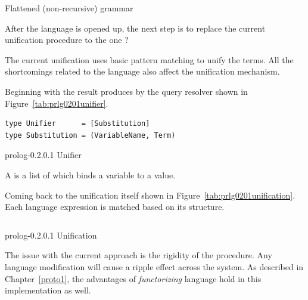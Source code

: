 \documentclass[thesis-solanki.tex]{subfiles}
\begin{document}
\begin{code-list}[th]
  \begin{singlespace}
    \inputminted[linenos]{haskell}{haskell-proto2-flattened-rarefy.hs}
  \end{singlespace}
  \caption{Flattened (non-recursive) grammar}
\label{tab:flatgrp0201}
\end{code-list}


After the language is opened up, the next step is to replace the current unification procedure to the one {\Huge
  ?}


The current unification uses basic pattern matching to unify the terms.
All the shortcomings related to the language also affect the unification mechanism.

Beginning with the result produces by the query resolver shown in Figure~\ref{tab:prlg0201unifier}.
\begin{code-list}[h]
\begin{verbatim}
type Unifier      = [Substitution]
type Substitution = (VariableName, Term)
\end{verbatim}
\caption{prolog-0.2.0.1 Unifier}
\label{tab:prlg0201unifier}
\end{code-list}
A  is a list of  which binds a variable to a value.

Coming back to the unification itself shown in Figure~\ref{tab:prlg0201unification}.
Each language expression is matched based on its structure.

\begin{code-list}[h]
  \begin{singlespace}
    \inputminted[linenos]{haskell}{haskell-proto2-unification-lion.hs}
  \end{singlespace}
\caption{prolog-0.2.0.1 Unification}
\label{tab:prlg0201unification}
\end{code-list}

The issue with the current approach is the rigidity of the procedure.
Any language modification will cause a ripple effect across the system.
As described in Chapter~\ref{proto1}, the advantages of \textit{functorizing} language hold in this implementation
as well.
\end{document}
